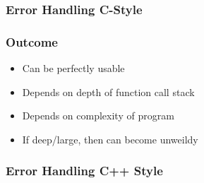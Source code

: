 \subsubsection{Error Handling C-Style}\label{error-handling-c-style}

\begin{Shaded}
\begin{Highlighting}[]
   
\NormalTok{\{}
  
  \NormalTok{\{}
     \NormalTok{;}
  \NormalTok{\} }  
     \NormalTok{;}
  \NormalTok{\} } \NormalTok{\{}
     \NormalTok{;}
  \NormalTok{\}}
\NormalTok{\}}

   
\NormalTok{\{}
  
  \NormalTok{) }
   \NormalTok{) }
 \NormalTok{\{}
 \NormalTok{\}}
\NormalTok{\} }
\end{Highlighting}
\end{Shaded}

\subsubsection{Outcome}\label{outcome}

\begin{itemize}
\itemsep1pt\parskip0pt
\item
  Can be perfectly usable
\item
  Depends on depth of function call stack
\item
  Depends on complexity of program
\item
  If deep/large, then can become unweildy
\end{itemize}

\subsubsection{Error Handling C++ Style}\label{error-handling-c-style-1}

